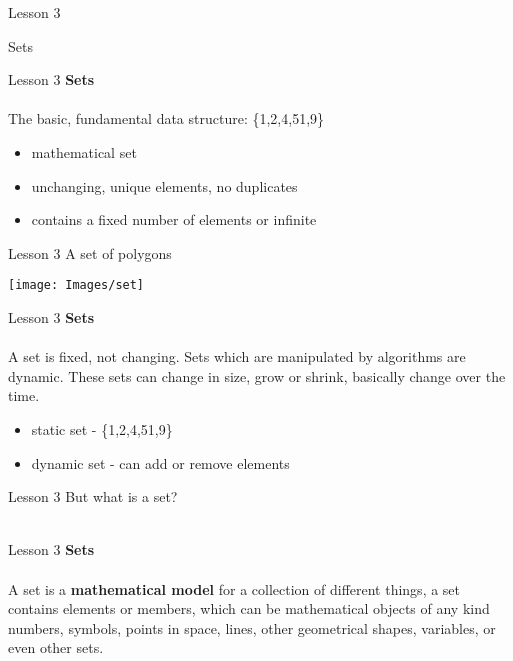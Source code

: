 \documentclass[aspectratio=1610]{beamer}
\begin{document}
\begin{frame}{Lesson 3}{}
\begin{center}
\Huge Sets 
\end{center}
\end{frame}


\begin{frame}{Lesson 3}{}
\LARGE
\textbf{Sets}\\~\\
The basic, fundamental data structure: \{1,2,4,51,9\}
\begin{itemize}
    \item mathematical set
    \item unchanging, unique elements, no duplicates
    \item contains a fixed number of elements or infinite
\end{itemize}

\end{frame}


\begin{frame}{Lesson 3}{}
\Huge{A set of polygons}
\begin{center}
\texttt{[image: Images/set]}
\end{center}
\end{frame}


\begin{frame}{Lesson 3}{}
\LARGE
\textbf{Sets}\\~\\
A set is fixed, not changing. Sets which are manipulated by algorithms are dynamic. These sets can change in size, grow or shrink, basically change over the time. 
\begin{itemize}
    \item static set - \{1,2,4,51,9\}
    \item dynamic set - can add or remove elements
\end{itemize}

\end{frame}



\begin{frame}{Lesson 3}{}
\Huge{But what is a set?}\\~\\
\end{frame}


\begin{frame}{Lesson 3}{}
\LARGE
\textbf{Sets}\\~\\
A set is a \textbf{mathematical model} for a collection of different things, a set contains elements or members, which can be mathematical objects of any kind numbers, symbols, points in space, lines, other geometrical shapes, variables, or even other sets.

\end{frame}
\end{document}
